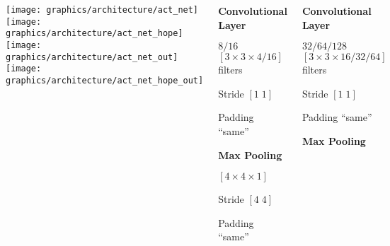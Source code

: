 \begin{frame}
\begin{columns}
{
            }
             {
                \centering
                \texttt{[image: graphics/architecture/act\_net]}
                \texttt{[image: graphics/architecture/act\_net\_hope]}
            }
             {
                \centering
                \texttt{[image: graphics/architecture/act\_net\_out]}
                \texttt{[image: graphics/architecture/act\_net\_hope\_out]}
            }
             {
                \begin{itemize}
                    \item \textbf{Convolutional Layer}
                    \item $8/16$ $\left[3\times 3\times 4/16\right]$ filters
                    \item Stride $\left[1\;1\right]$
                    \item Padding ``same''
                     {
                        \item \textbf{Max Pooling}
                        \item $\left[4\times 4\times 1\right]$
                        \item Stride $\left[4\;4\right]$
                        \item Padding ``same''
                    }
                \end{itemize}
            }
             {
                \begin{itemize}
                    \item \textbf{Convolutional Layer}
                    \item $32/64/128$ $\left[3\times 3\times 16/32/64\right]$ filters
                    \item Stride $\left[1\;1\right]$
                    \item Padding ``same''
                     {
                        \item \textbf{Max Pooling}
}
\end{itemize}}
\end{columns}
\end{frame}
